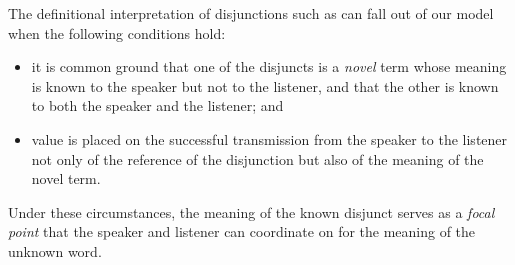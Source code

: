 \documentclass{article}
\begin{document}
\begin{examples}
\item The definitional interpretation of disjunctions such as can fall
  out of our model when the following conditions hold:
%
  \begin{itemize}
  \item it is common ground that one of the disjuncts is a
    \emph{novel} term whose meaning is known to the speaker but not to
    the listener, and that the other is known to both the speaker and
    the listener; and
  \item value is placed on the successful transmission from the
    speaker to the listener not only of the reference of the
    disjunction but also of the meaning of the novel term.
  \end{itemize}
  Under these circumstances, the meaning of the known disjunct serves
  as a \emph{focal point} that the speaker and listener can coordinate
  on for the meaning of the unknown word.
\end{examples}




\end{document}
